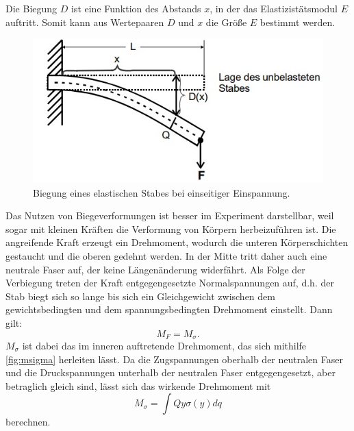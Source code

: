 Die Biegung $D$ ist eine Funktion des Abstands $x$, in der das Elastizistätsmodul $E$ auftritt. Somit kann aus Wertepaaren $D$ und $x$ die Größe $E$ bestimmt werden.
\begin{figure}[H]
    \includegraphics[width=\linewidth]{img/abb2.jpg}
    \caption{Biegung eines elastischen Stabes bei einseitiger Einspannung.}
    \label{fig:biegung}
\end{figure}
Das Nutzen von Biegeverformungen ist besser im Experiment darstellbar, weil sogar mit kleinen Kräften die Verformung von Körpern herbeizuführen ist.
Die angreifende Kraft erzeugt  ein Drehmoment, wodurch die unteren Körperschichten gestaucht und die oberen gedehnt werden.
In der Mitte tritt daher auch eine neutrale Faser auf, der keine Längenänderung widerfährt.
Als Folge der Verbiegung treten der Kraft entgegengesetzte Normalspannungen auf, d.h. der Stab biegt sich so lange bis sich ein Gleichgewicht zwischen dem
gewichtsbedingten und dem spannungsbedingten Drehmoment einstellt. Dann gilt:
\begin{equation}
    M_F = M_{\sigma}.
\end{equation}
$M_{\sigma}$ ist dabei das im inneren auftretende Drehmoment, das sich mithilfe \autoref{fig:msigma} herleiten lässt. Da die Zugspannungen oberhalb der neutralen
Faser und die Druckspannungen unterhalb der neutralen Faser entgegengesetzt, aber betraglich gleich sind, lässt sich das wirkende Drehmoment mit
\begin{equation}
    M_{\sigma} = \int{Q} y\sigma(y) dq
\end{equation}
berechnen.